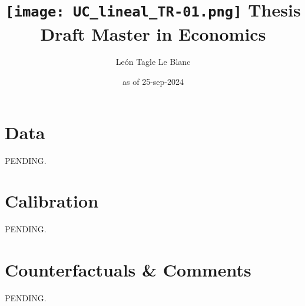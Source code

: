 \documentclass[11pt]{article}
\title{\texttt{[image: UC\_lineal\_TR-01.png]} \linebreak \linebreak 
Thesis Draft \linebreak Master in Economics}
\author{León Tagle Le Blanc}
\date{as of 25-sep-2024}
\begin{document}
\begin{titlepage}
\maketitle
\tableofcontents
\setcounter{page}{0}
\thispagestyle{empty}
\end{titlepage}











\section{Data}

PENDING.

\section{Calibration}

PENDING.

\section{Counterfactuals \& Comments}

PENDING.

\newpage

	 


\newpage


\end{document}
